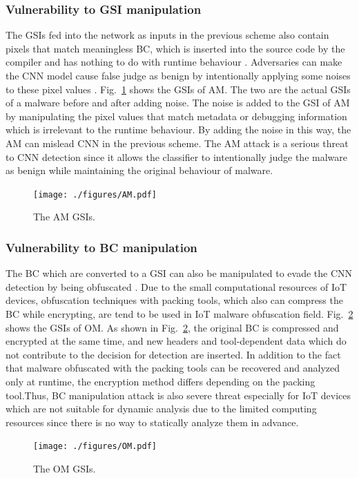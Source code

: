\documentclass{ieeeaccess}
\newcommand{\myfigurename}{Fig.}
\begin{document}
\subsubsection{Vulnerability to GSI manipulation}
The GSIs fed into the network as inputs in the previous scheme also contain pixels that match meaningless BC, which is inserted into the source code by the compiler and has nothing to do with runtime behaviour \cite{am}.
Adversaries can make the CNN model cause false judge as benign by intentionally applying some noises to these pixel values \cite{am}.
\myfigurename~\ref{fig:amGSI} shows the GSIs of AM.
The two are the actual GSIs of a malware before and after adding noise.
The noise is added to the GSI of AM by manipulating the pixel values that match metadata or debugging information which is irrelevant to the runtime behaviour.
By adding the noise in this way, the AM can mislead CNN in the previous scheme.
The AM attack is a serious threat to CNN detection since it allows the classifier to intentionally judge the malware as benign while maintaining the original behaviour of malware.

\begin{figure}[t]
 \centering
 \texttt{[image: ./figures/AM.pdf]}
 \caption{The AM GSIs.} 
 \label{fig:amGSI}
\end{figure}
\subsubsection{Vulnerability to BC manipulation}
The BC which are converted to a GSI can also be manipulated to evade the CNN detection by being obfuscated \cite{om}.
Due to the small computational resources of IoT devices, obfuscation techniques with packing tools, which also can compress the BC while encrypting, are tend to be used in IoT malware obfuscation field.
\myfigurename~\ref{fig:omGSI} shows the GSIs of OM.
As shown in \myfigurename~\ref{fig:omGSI}, the original BC is compressed and encrypted at the same time, and new headers and tool-dependent data which do not contribute to the decision for detection are inserted.
In addition to the fact that malware obfuscated with the packing tools can be recovered and analyzed only at runtime, the encryption method differs depending on the packing tool.Thus, BC manipulation attack is also severe threat especially for IoT devices which are not suitable for dynamic analysis due to the limited computing resources since there is no way to statically analyze them in advance.

\begin{figure}[t]
 \centering
 \texttt{[image: ./figures/OM.pdf]}
 \caption{The OM GSIs.} 
 \label{fig:omGSI}
\end{figure}
\end{document}

